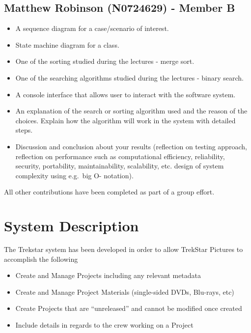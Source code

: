 \documentclass[
  english,
  a4paper,
,tablecaptionabove
]{scrartcl}
\providecommand{\tightlist}{%
  \setlength{\itemsep}{0pt}\setlength{\parskip}{0pt}}
\begin{document}
\hypertarget{matthew-robinson-n0724629---member-b}{%
\subsection{Matthew Robinson (N0724629) - Member
B}\label{matthew-robinson-n0724629---member-b}}

\begin{itemize}
\tightlist
\item
  A sequence diagram for a case/scenario of interest.
\item
  State machine diagram for a class.
\item
  One of the sorting studied during the lectures - merge sort.
\item
  One of the searching algorithms studied during the lectures - binary
  search.
\item
  A console interface that allows user to interact with the software
  system.
\item
  An explanation of the search or sorting algorithm used and the reason
  of the choices. Explain how the algorithm will work in the system with
  detailed steps.
\item
  Discussion and conclusion about your results (reflection on testing
  approach, reflection on performance such as computational efficiency,
  reliability, security, portability, maintainability, scalability, etc.
  design of system complexity using e.g.~big O- notation).
\end{itemize}

All other contributions have been completed as part of a group effort.

\newpage

\hypertarget{system-description}{%
\section{System Description}\label{system-description}}

The Trekstar system has been developed in order to allow TrekStar
Pictures to accomplish the following

\begin{itemize}
\tightlist
\item
  Create and Manage Projects including any relevant metadata
\item
  Create and Manage Project Materials (single-sided DVDs, Blu-rays, etc)
\item
  Create Projects that are \enquote{unreleased} and cannot be modified
  once created
\item
  Include details in regards to the crew working on a Project
\end{itemize}
\end{document}
